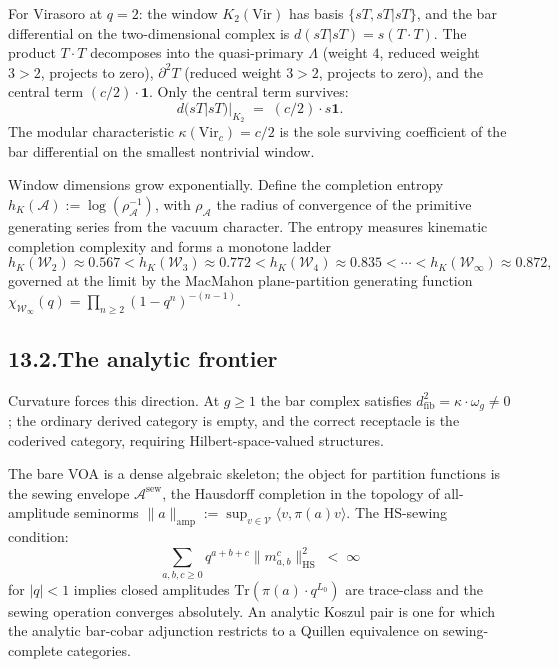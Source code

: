 \documentclass[11pt]{report}
\theoremstyle{definition}
\theoremstyle{remark}
\providecommand{\cA}{\mathcal{A}}
\providecommand{\cW}{\mathcal{W}}
\providecommand{\cV}{\mathcal{V}}
\providecommand{\Tr}{\mathrm{Tr}}
\providecommand{\Vir}{\mathrm{Vir}}
\numberwithin{equation}{section}
\begin{document}
For Virasoro at $q = 2$: the window $K_2(\Vir)$ has basis
$\{sT, sT|sT\}$, and the bar differential on the two-dimensional
complex is $d(sT|sT) = s(T\cdot T)$. The product $T\cdot T$
decomposes into the quasi-primary $\Lambda$ (weight $4$,
reduced weight $3 > 2$, projects to zero), $\partial^2 T$
(reduced weight $3 > 2$, projects to zero), and the central
term $(c/2)\cdot\mathbf 1$. Only the central term survives:
\[
d(sT|sT)|_{K_2} \;=\; (c/2)\cdot s\mathbf 1.
\]
The modular characteristic $\kappa(\Vir_c) = c/2$ is the sole
surviving coefficient of the bar differential on the smallest
nontrivial window.

Window dimensions grow exponentially. Define the completion
entropy $h_K(\cA) := \log(\rho_\cA^{-1})$, with $\rho_\cA$ the
radius of convergence of the primitive generating series from
the vacuum character. The entropy measures kinematic
completion complexity and forms a monotone ladder
\[
h_K(\cW_2) \approx 0.567
< h_K(\cW_3) \approx 0.772
< h_K(\cW_4) \approx 0.835
< \cdots
< h_K(\cW_\infty) \approx 0.872,
\]
governed at the limit by the MacMahon plane-partition
generating function
$\chi_{\cW_\infty}(q) = \prod_{n \ge 2}(1 - q^n)^{-(n-1)}$.

\subsection*{13.2.\enspace The analytic frontier}

Curvature forces this direction. At $g \ge 1$ the bar complex
satisfies $d_{\mathrm{fib}}^2 = \kappa\cdot\omega_g \neq 0$;
the ordinary derived category is empty, and the correct
receptacle is the coderived category, requiring
Hilbert-space-valued structures.

The bare VOA is a dense algebraic skeleton; the object for
partition functions is the sewing envelope $\cA^{\mathrm{sew}}$,
the Hausdorff completion in the topology of all-amplitude
seminorms $\|a\|_{\mathrm{amp}} := \sup_{v \in \cV}
\langle v, \pi(a) v\rangle$. The HS-sewing condition:
\[
\sum_{a,b,c \ge 0} q^{a+b+c}\|m^c_{a,b}\|^2_{\mathrm{HS}}
\;<\;\infty
\]
for $|q| < 1$ implies closed amplitudes
$\Tr(\pi(a)\cdot q^{L_0})$ are trace-class and the sewing
operation converges absolutely. An analytic Koszul pair is
one for which the analytic bar-cobar adjunction restricts to a
Quillen equivalence on sewing-complete categories.
\end{document}
